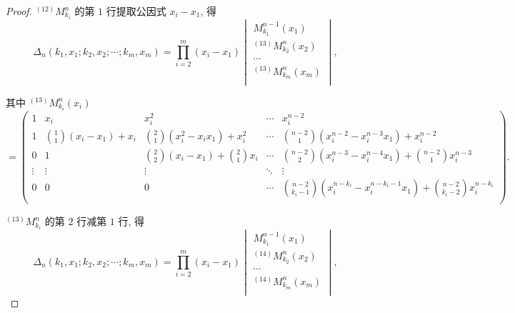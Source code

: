 \documentclass{ctexart}
\begin{document}
\begin{proof}
    $^{(12)}M_{k_i}^n$ 的第 $1$ 行提取公因式 $x_i-x_1$, 得
    \[\Delta_n(k_1,x_1;k_2,x_2;\cdots;k_m,x_m)=\prod\limits_{i=2}^m(x_i-x_1)\begin{vmatrix}
        M_{k_1}^{n-1}(x_1) \\
        ^{(13)}M_{k_2}^n(x_2) \\
        \cdots \\
        ^{(13)}M_{k_m}^n(x_m) \\
    \end{vmatrix},\]

    其中 $^{(13)}M_{k_i}^n(x_i)$
    \[=\begin{pmatrix}
        1 & x_i & x_i^2 & \cdots & x_i^{n-2} \\[4pt]
        1 & \binom{1}{1}(x_i-x_1)+x_i & \binom{2}{1}(x_i^2-x_ix_1)+x_i^2 & \cdots & \binom{n-2}{1}(x_i^{n-2}-x_i^{n-3}x_1)+x_i^{n-2} \\[10pt]
        0 & 1 & \binom{2}{2}(x_i-x_1)+\binom{2}{1}x_i & \cdots & \binom{n-2}{2}(x_i^{n-3}-x_i^{n-4}x_1)+\binom{n-2}{1}x_i^{n-3} \\
        \vdots & \vdots & \vdots & \ddots & \vdots \\[4pt]
        0 & 0 & 0 & \cdots & \binom{n-2}{k_i-1}(x_i^{n-k_i}-x_i^{n-k_i-1}x_1)+\binom{n-2}{k_i-2}x_i^{n-k_i} \\
    \end{pmatrix}.\]

    $^{(13)}M_{k_i}^n$ 的第 $2$ 行减第 $1$ 行, 得
    \[\Delta_n(k_1,x_1;k_2,x_2;\cdots;k_m,x_m)=\prod\limits_{i=2}^m(x_i-x_1)\begin{vmatrix}
        M_{k_1}^{n-1}(x_1) \\
        ^{(14)}M_{k_2}^n(x_2) \\
        \cdots \\
        ^{(14)}M_{k_m}^n(x_m) \\
    \end{vmatrix},\]


\end{proof}
\end{document}
